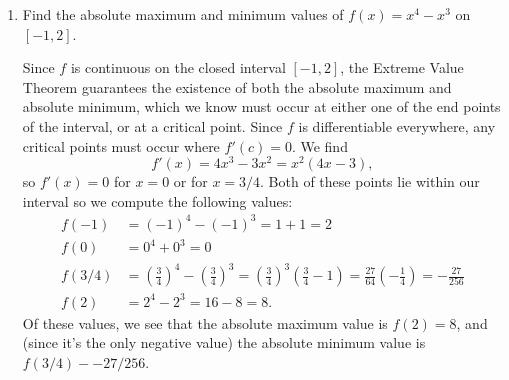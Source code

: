 \documentclass[12pt]{article}
\begin{document}
\begin{enumerate}
\bigskip

 \item Find the absolute maximum and minimum values of $f(x)=x^4-x^3$ on $[-1,2]$.

\bigskip

Since $f$ is continuous on the closed interval $[-1,2]$, the Extreme Value Theorem guarantees the existence of both the absolute maximum and absolute minimum, which we know must occur at either one of the end points of the interval, or at a critical point. Since $f$ is differentiable everywhere, any critical points must occur where $f'(c)=0$. We find
\[
 f'(x) = 4x^3-3x^2 = x^2(4x-3),
\]
so $f'(x)=0$ for $x=0$ or for $x=3/4$. Both of these points lie within our interval so we compute the following values:
\begin{align*}
 f(-1) & = (-1)^4-(-1)^3 = 1+1=2\\
 f(0) & = 0^4+0^3=0\\
 f(3/4) & = \left(\frac{3}{4}\right)^4-\left(\frac{3}{4}\right)^3 = \left(\frac{3}{4}\right)^3\left(\frac{3}{4}-1\right) = \frac{27}{64}\left(-\frac{1}{4}\right) = -\frac{27}{256}\\
 f(2) & = 2^4-2^3 = 16-8=8.
\end{align*}
Of these values, we see that the absolute maximum value is $f(2)=8$, and (since it's the only negative value) the absolute minimum value is $f(3/4) - -27/256$.

\end{enumerate}
\end{document}
